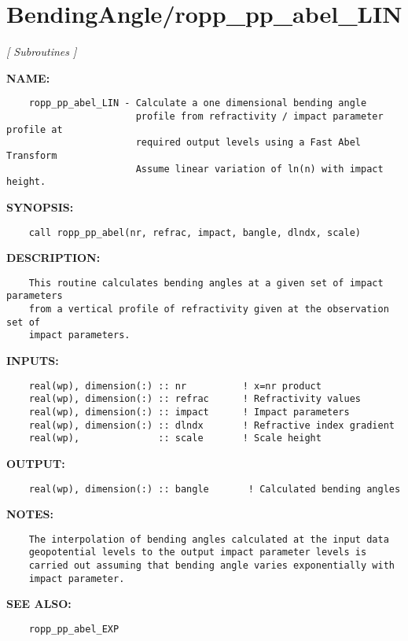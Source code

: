 \section{BendingAngle/ropp\_pp\_abel\_LIN}
\textsl{[ Subroutines ]}

\label{ch:robo1}
\label{ch:BendingAngle_ropp_pp_abel_LIN}
\textbf{NAME:}\hspace{0.08in}\begin{Verbatim}
    ropp_pp_abel_LIN - Calculate a one dimensional bending angle
                       profile from refractivity / impact parameter profile at
                       required output levels using a Fast Abel Transform
                       Assume linear variation of ln(n) with impact height.  
\end{Verbatim}
\textbf{SYNOPSIS:}\hspace{0.08in}\begin{Verbatim}
    call ropp_pp_abel(nr, refrac, impact, bangle, dlndx, scale)
\end{Verbatim}
\textbf{DESCRIPTION:}\hspace{0.08in}\begin{Verbatim}
    This routine calculates bending angles at a given set of impact parameters
    from a vertical profile of refractivity given at the observation set of
    impact parameters.
\end{Verbatim}
\textbf{INPUTS:}\hspace{0.08in}\begin{Verbatim}
    real(wp), dimension(:) :: nr          ! x=nr product
    real(wp), dimension(:) :: refrac      ! Refractivity values
    real(wp), dimension(:) :: impact      ! Impact parameters
    real(wp), dimension(:) :: dlndx       ! Refractive index gradient
    real(wp),              :: scale       ! Scale height
\end{Verbatim}
\textbf{OUTPUT:}\hspace{0.08in}\begin{Verbatim}
    real(wp), dimension(:) :: bangle       ! Calculated bending angles
\end{Verbatim}
\textbf{NOTES:}\hspace{0.08in}\begin{Verbatim}
    The interpolation of bending angles calculated at the input data
    geopotential levels to the output impact parameter levels is
    carried out assuming that bending angle varies exponentially with
    impact parameter.
\end{Verbatim}
\textbf{SEE ALSO:}\hspace{0.08in}\begin{Verbatim}
    ropp_pp_abel_EXP
\end{Verbatim}
